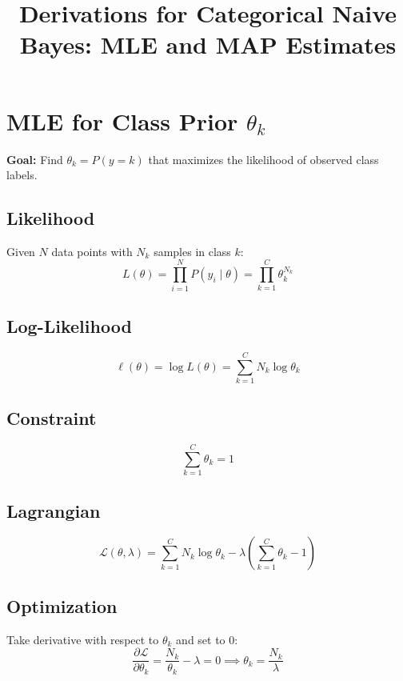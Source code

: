 \documentclass[11pt]{article}
\title{Derivations for Categorical Naive Bayes: MLE and MAP Estimates}
\author{}
\date{}
\begin{document}
\maketitle

\section{MLE for Class Prior $\theta_k$}

\textbf{Goal:} Find $\theta_k = P(y = k)$ that maximizes the likelihood of observed class labels.

\subsection{Likelihood}
Given $N$ data points with $N_k$ samples in class $k$:
\begin{equation}
L(\theta) = \prod_{i=1}^N P(y_i \mid \theta) = \prod_{k=1}^C \theta_k^{N_k}
\end{equation}

\subsection{Log-Likelihood}
\begin{equation}
\ell(\theta) = \log L(\theta) = \sum_{k=1}^C N_k \log \theta_k
\end{equation}

\subsection{Constraint}
\begin{equation}
\sum_{k=1}^C \theta_k = 1
\end{equation}

\subsection{Lagrangian}
\begin{equation}
\mathcal{L}(\theta, \lambda) = \sum_{k=1}^C N_k \log \theta_k - \lambda\left(\sum_{k=1}^C \theta_k - 1\right)
\end{equation}

\subsection{Optimization}
Take derivative with respect to $\theta_k$ and set to 0:
\begin{equation}
\frac{\partial \mathcal{L}}{\partial \theta_k} = \frac{N_k}{\theta_k} - \lambda = 0 \implies \theta_k = \frac{N_k}{\lambda}
\end{equation}
\end{document}
